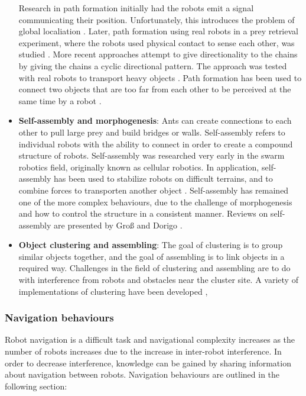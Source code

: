 \begin{itemize}
	Research in path formation initially had the robots emit a signal communicating their position. Unfortunately, this introduces the problem of global localiation \cite{goss1992harvesting}. Later, path formation using real robots in a prey retrieval experiment, where the robots used physical contact to sense each other, was studied \cite{werger1996robotic}. More recent approaches attempt to give directionality to the chains by giving the chains a cyclic directional pattern. The approach was tested with real robots to transport heavy objects \cite{nouyan2006group}. Path formation has been used to connect two objects that are too far from each other to be perceived at the same time by a robot \cite{nouyan2006chain}.

	\item \textbf{Self-assembly and morphogenesis}: 
	Ants can create connections to each other to pull large prey and build bridges or walls. Self-assembly refers to individual robots with the ability to connect in order to create a compound structure of robots. Self-assembly was researched very early in the swarm robotics field, originally known as cellular robotics. In application, self-assembly has been used to stabilize robots on difficult terrains, and to combine forces to transporten another object \cite{brambilla2013swarm}. Self-assembly has remained one of the more complex behaviours, due to the challenge of morphogenesis and how to control the structure in a consistent manner. Reviews on self-assembly are presented by Gro{\ss} and Dorigo \cite{gross2008self}.
	
	\item \textbf{Object clustering and assembling}:
	The goal of clustering is to group similar objects together, and the goal of assembling is to link objects in a required way. Challenges in the field of clustering and assembling are to do with interference from robots and obstacles near the cluster site. A variety of implementations of clustering have been developed \cite{beckers1994local},
\end{itemize}

\subsubsection{Navigation behaviours}
Robot navigation is a difficult task and navigational complexity increases as the number of robots increases due to the increase in inter-robot interference.  In order to decrease interference, knowledge can be gained by sharing information about navigation between robots. Navigation behaviours are outlined in the following section:

